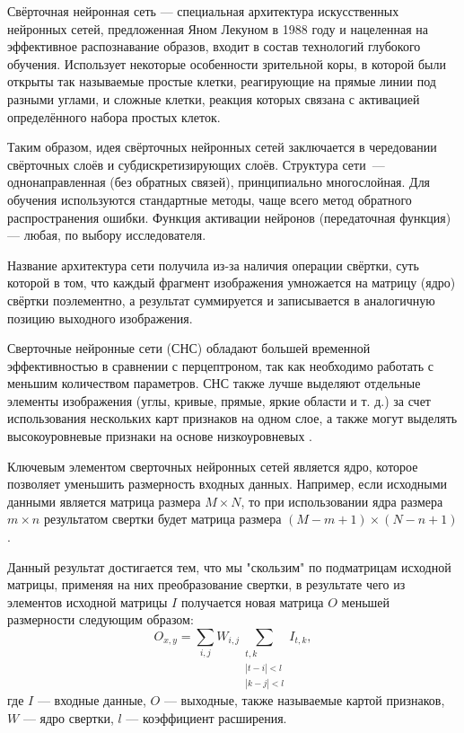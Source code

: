 Свёрточная нейронная сеть — специальная архитектура искусственных нейронных сетей, предложенная Яном Лекуном в 1988 году и нацеленная на эффективное распознавание образов, входит в состав технологий глубокого обучения. 
Использует некоторые особенности зрительной коры, в которой были открыты так называемые простые клетки, реагирующие на прямые линии под разными углами, и сложные клетки, реакция которых связана с активацией определённого набора простых клеток. 

Таким образом, идея свёрточных нейронных сетей заключается в чередовании свёрточных слоёв и субдискретизирующих слоёв. Структура сети — однонаправленная (без обратных связей), принципиально многослойная. Для обучения используются стандартные методы, чаще всего метод обратного распространения ошибки. Функция активации нейронов (передаточная функция) — любая, по выбору исследователя.

Название архитектура сети получила из-за наличия операции свёртки, суть которой в том, что каждый фрагмент изображения умножается на матрицу (ядро) свёртки поэлементно, а результат суммируется и записывается в аналогичную позицию выходного изображения. 

Сверточные нейронные сети (СНС) обладают большей временной эффективностью в сравнении с перцептроном, так как необходимо
работать с меньшим количеством параметров. СНС также лучше выделяют отдельные элементы изображения (углы,
кривые, прямые, яркие области и т. д.) за счет использования нескольких карт признаков на одном слое, а также могут 
выделять высокоуровневые признаки на основе низкоуровневых \cite{cyberbred}.

Ключевым элементом сверточных нейронных сетей является ядро, которое позволяет уменьшить размерность входных данных.
Например, если исходными данными является матрица размера $M\times N$, то при использовании ядра размера $m\times n$ результатом свертки будет
матрица размера $(M-m+1)\times(N-n+1)$ \cite{cyberbred}.

Данный результат достигается тем, что мы "скользим" по подматрицам исходной матрицы, применяя на них преобразование свертки,
в результате чего из элементов исходной матрицы $I$ получается новая матрица $O$ меньшей размерности следующим образом:
\begin{equation}
	O_{x,y} = \sum_{i,j} W_{i,j} \sum_{\substack{t,k\\\left|t-i\right|<l\\ \left|k-j\right|<l} } I_{t,k},
\end{equation}
где 
$I$ — входные данные, $O$ — выходные, также называемые картой признаков, $W$ — ядро свертки, $l$ — коэффициент расширения. 

